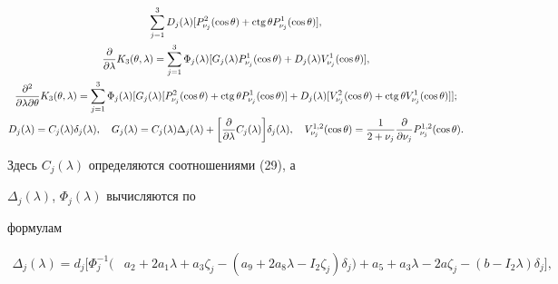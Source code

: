 \begin{exam}
\begin{gather}
\sum^3_{j=1}D_j(\lambda)[P^2_{\nu_j}(\cos\theta)+ 


\ctg\theta P^1_{\nu_j}(\cos\theta)],\notag \\ 


% 


\frac{\partial}{\partial\lambda}K_3(\theta,\lambda)= 


\sum^3_{j=1}\Phi_j(\lambda)[G_j(\lambda)P^1_{\nu_j} 


(\cos\theta)+D_j(\lambda)V^1_{\nu_j}(\cos\theta)], \\ 


% 


\frac{\partial^2}{\partial\lambda\partial\theta} 


K_3(\theta,\lambda)=\sum^3_{j=1}\Phi_j(\lambda) 


[G_j(\lambda)[P^2_{\nu_j}(\cos\theta)+\ctg\theta 


P^1_{\nu_j}(\cos\theta)]+D_j(\lambda) 


[V^2_{\nu_j}(\cos\theta)+\ctg\theta V^1_{\nu_j}(\cos\theta)]];\notag\\ 


% 


D_j(\lambda)=C_j(\lambda)\delta_j(\lambda),\quad 


G_j(\lambda)=C_j(\lambda)\Delta_j(\lambda)+\bigg[ 


\frac{\partial}{\partial\lambda}C_j(\lambda)\bigg] 


\delta_j(\lambda),\quad 


V^{1,2}_{\nu_j}(\cos\theta)=\frac{1}{2+\nu_j} 


\frac{\partial}{\partial\nu_j}P^{1,2}_{\nu_j}(\cos\theta). \notag


\end{gather} 


Здесь $C_j(\lambda)$ определяются соотношениями (29), а 


$\Delta_j(\lambda)$, $\Phi_j(\lambda)$ вычисляются по 


формулам 


\begin{equation} 


\begin{split} 


\Delta_j(\lambda)=d_j[\Phi^{-1}_j(&a_2+2a_1\lambda+a_3\zeta_j- 


(a_9+2a_8\lambda-I_2\zeta_j)\delta_j)+ 


a_5+a_3\lambda-2a\zeta_j-(b-I_2\lambda)\delta_j],\\ 



\end{split}
\end{equation}
\end{exam}
